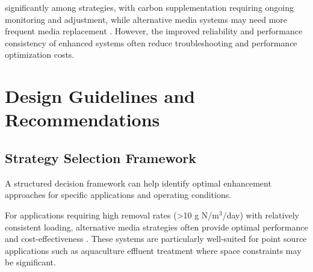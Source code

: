 \documentclass[12pt,a4paper]{article}
\begin{document}
 significantly among strategies, with carbon supplementation requiring ongoing monitoring and adjustment, while alternative media systems may need more frequent media replacement \citep{RN310}. However, the improved reliability and performance consistency of enhanced systems often reduce troubleshooting and performance optimization costs.

\section{Design Guidelines and Recommendations}

\subsection{Strategy Selection Framework}

 A structured decision framework can help identify optimal enhancement approaches for specific applications and operating conditions.


For applications requiring high removal rates (>10 g N/m$^3$/day) with relatively consistent loading, alternative media strategies often provide optimal performance and cost-effectiveness \citep{RN312, RN1023, RN258}. These systems are particularly well-suited for point source applications such as aquaculture effluent treatment where space constraints may be significant.
\end{document}
